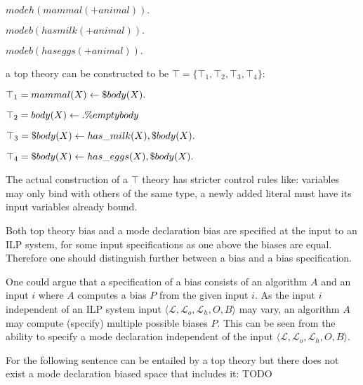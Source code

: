 $modeh(mammal(+animal)).$

$modeb(has milk(+animal)).$

$modeb(has eggs(+animal)).$

a top theory can be constructed to be $\top=\{\top_1, \top_2, \top_3, \top_4\}$:

$\top_1=mammal(X) \leftarrow \$body(X).$

$\top_2=body(X) \leftarrow .\%emptybody$

$\top_3=\$body(X) \leftarrow has\_milk(X), \$body(X).$

$\top_4=\$body(X) \leftarrow has\_eggs(X), \$body(X).$

The actual construction of a $\top$ theory has stricter control rules like: variables may only bind with others of the same type, a newly added literal must have its input variables already bound.

Both top theory bias and a mode declaration bias are specified at the input to an ILP system, for some input specifications as one above the biases are equal. Therefore one should distinguish further between a bias and a bias specification.

One could argue that a specification of a bias consists of an algorithm $A$ and an input $i$ where $A$ computes a bias $P$ from the given input $i$. As the input $i$ independent of an ILP system input $\langle\mathcal{L}, \mathcal{L}_o, \mathcal{L}_h, O, B\rangle$ may vary, an algorithm $A$ may compute (specify) multiple possible biases $P$. This can be seen from the ability to specify a mode declaration independent of the input
$\langle\mathcal{L}, \mathcal{L}_o, \mathcal{L}_h, O, B\rangle$.

\begin{exmp}
For the following sentence can be entailed by a top theory but there does not exist a mode declaration biased space that includes it:
TODO
\end{exmp}


